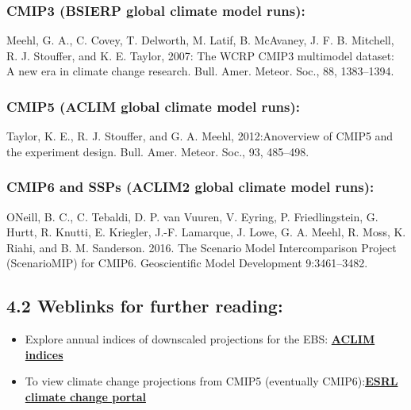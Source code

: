 \documentclass[
]{article}
\begin{document}
\hypertarget{cmip3-bsierp-global-climate-model-runs}{%
\subsubsection{CMIP3 (BSIERP global climate model
runs):}\label{cmip3-bsierp-global-climate-model-runs}}

Meehl, G. A., C. Covey, T. Delworth, M. Latif, B. McAvaney, J. F. B.
Mitchell, R. J. Stouffer, and K. E. Taylor, 2007: The WCRP CMIP3
multimodel dataset: A new era in climate change research. Bull. Amer.
Meteor. Soc., 88, 1383--1394.

\hypertarget{cmip5-aclim-global-climate-model-runs}{%
\subsubsection{CMIP5 (ACLIM global climate model
runs):}\label{cmip5-aclim-global-climate-model-runs}}

Taylor, K. E., R. J. Stouffer, and G. A. Meehl, 2012:Anoverview of CMIP5
and the experiment design. Bull. Amer. Meteor. Soc., 93, 485--498.

\hypertarget{cmip6-and-ssps-aclim2-global-climate-model-runs}{%
\subsubsection{CMIP6 and SSPs (ACLIM2 global climate model
runs):}\label{cmip6-and-ssps-aclim2-global-climate-model-runs}}

ONeill, B. C., C. Tebaldi, D. P. van Vuuren, V. Eyring, P.
Friedlingstein, G. Hurtt, R. Knutti, E. Kriegler, J.-F. Lamarque, J.
Lowe, G. A. Meehl, R. Moss, K. Riahi, and B. M. Sanderson. 2016. The
Scenario Model Intercomparison Project (ScenarioMIP) for CMIP6.
Geoscientific Model Development 9:3461--3482.

\hypertarget{weblinks-for-further-reading}{%
\subsection{4.2 Weblinks for further
reading:}\label{weblinks-for-further-reading}}

\begin{itemize}
\item
  Explore annual indices of downscaled projections for the EBS:
  \href{https://kholsman.shinyapps.io/aclim/}{\textbf{ACLIM indices}}
\item
  To view climate change projections from CMIP5 (eventually
  CMIP6):\href{https://www.esrl.noaa.gov/psd/ipcc/ocn/}{\textbf{ESRL
  climate change portal }}
\end{itemize}
\end{document}
